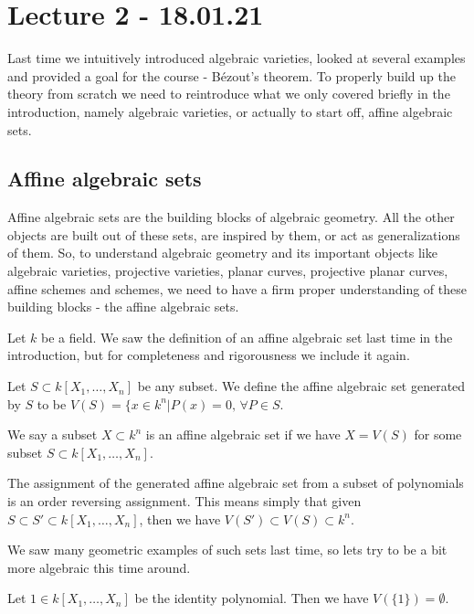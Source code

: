 \section{Lecture 2 - 18.01.21}

Last time we intuitively introduced algebraic varieties, looked at several examples and provided a goal for the course - Bézout's theorem. To properly build up the theory from scratch we need to reintroduce what we only covered briefly in the introduction, namely algebraic varieties, or actually to start off, affine algebraic sets. 

\subsection{Affine algebraic sets}

Affine algebraic sets are the building blocks of algebraic geometry. All the other objects are built out of these sets, are inspired by them, or act as generalizations of them. So, to understand algebraic geometry and its important objects like algebraic varieties, projective varieties, planar curves, projective planar curves, affine schemes and schemes, we need to have a firm proper understanding of these building blocks - the affine algebraic sets. 

Let $k$ be a field. We saw the definition of an affine algebraic set last time in the introduction, but for completeness and rigorousness we include it again.

\begin{definition}
Let $S\subset k[X_1, \ldots, X_n]$ be any subset. We define the affine algebraic set generated by $S$ to be $V(S)=\{ x\in k^n \vert P(x)=0,\, \forall P\in S$. 
\end{definition}

\begin{definition}
We say a subset $X\subset k^n$ is an affine algebraic set if we have $X=V(S)$ for some subset $S\subset k[X_1, \ldots, X_n]$.
\end{definition}

The assignment of the generated affine algebraic set from a subset of polynomials is an order reversing assignment. This means simply that given $S\subset S' \subset k[X_1, \ldots, X_n]$, then we have $V(S')\subset V(S) \subset k^n$.

We saw many geometric examples of such sets last time, so lets try to be a bit more algebraic this time around.  

\begin{example}
Let $1\in k[X_1, \ldots, X_n]$ be the identity polynomial. Then we have $V(\{1\}) = \emptyset$.
\end{example}

